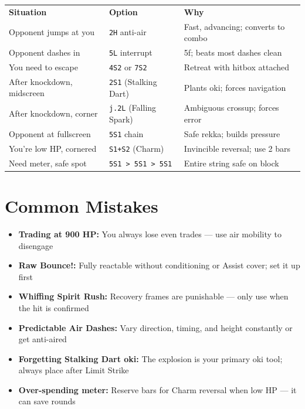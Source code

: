 \documentclass[12pt, a4paper]{report}
\newcommand{\faExclamationTriangle}{\ding{52}}
\newcommand{\notation}[1]{{\small\texttt{\textcolor{ahriCyan}{#1}}}}
\newcommand{\movename}[1]{\textbf{\textcolor{ahriGold}{#1}}}
\begin{document}
\begin{center}
\begin{tabularx}{\linewidth}{L{4.2cm} L{3.5cm} L{5.3cm}}
\textcolor{ahriCyan}{\textbf{Situation}} &
\textcolor{ahriCyan}{\textbf{Option}} &
\textcolor{ahriCyan}{\textbf{Why}} \\
Opponent jumps at you & \notation{2H} anti-air & Fast, advancing; converts to combo \\
Opponent dashes in & \notation{5L} interrupt & 5f; beats most dashes clean \\
You need to escape & \notation{4S2} or \notation{7S2} & Retreat with hitbox attached \\
After knockdown, midscreen & \notation{2S1} (Stalking Dart) & Plants oki; forces navigation \\
After knockdown, corner & \notation{j.2L} (Falling Spark) & Ambiguous crossup; forces error \\
Opponent at fullscreen & \notation{5S1} chain & Safe rekka; builds pressure \\
You're low HP, cornered & \notation{S1+S2} (Charm) & Invincible reversal; use 2 bars \\
Need meter, safe spot & \notation{5S1 > 5S1 > 5S1} & Entire string safe on block \\
\end{tabularx}
\end{center}

\section{Common Mistakes}

\begin{warnbox}[title={\faExclamationTriangle\enspace TOP MISTAKES TO AVOID}]
\begin{itemize}[itemsep=4pt]
  \item \movename{Trading at 900 HP:} You always lose even trades --- use air mobility to disengage
  \item \movename{Raw Bounce!:} Fully reactable without conditioning or Assist cover; set it up first
  \item \movename{Whiffing Spirit Rush:} Recovery frames are punishable --- only use when the hit is confirmed
  \item \movename{Predictable Air Dashes:} Vary direction, timing, and height constantly or get anti-aired
  \item \movename{Forgetting Stalking Dart oki:} The explosion is your primary oki tool; always place after Limit Strike
  \item \movename{Over-spending meter:} Reserve bars for Charm reversal when low HP --- it can save rounds
\end{itemize}
\end{warnbox}
\end{document}
